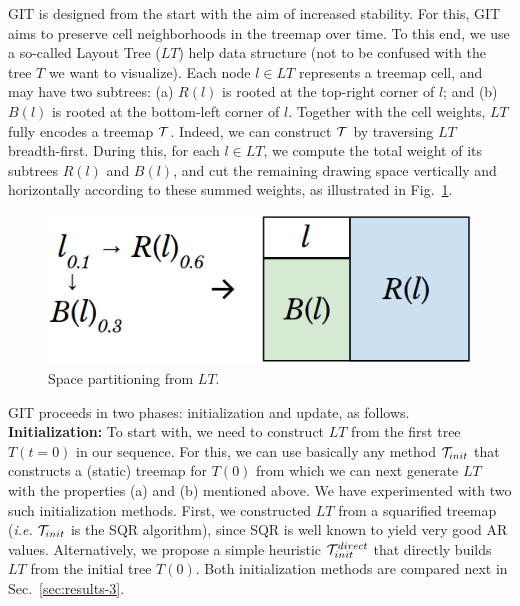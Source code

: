GIT is designed from the start with the aim of increased stability. For this, GIT aims to preserve cell neighborhoods in the treemap over time. To this end, we use a so-called Layout Tree ($LT$) help data structure (not to be confused with the tree $T$ we want to visualize).
Each node $l \in LT$ represents a treemap cell, and may have two subtrees: (a) $R(l)$ is rooted at the top-right corner of $l$; and (b) $B(l)$ is rooted at the bottom-left corner of $l$. Together with the cell weights, $LT$ fully encodes a treemap ${\cal T}$. Indeed, we can construct ${\cal T}$ by traversing $LT$ breadth-first.
During this, for each $l \in LT$, we compute the total weight of its subtrees $R(l)$ and $B(l)$, and cut the remaining drawing space vertically and horizontally according to these summed weights, as illustrated in Fig.~\ref{fig:space-partition}.

\begin{figure}
\centering
\includegraphics[width=.8\textwidth]{figures/treemap-algorithm/space-partition.png}
\caption{Space partitioning from $LT$.}
\label{fig:space-partition}
\end{figure}

GIT proceeds in two phases: initialization and update, as follows.\\

\noindent\textbf{Initialization:} To start with, we need to construct $LT$ from the first tree $T(t=0)$ in our sequence. For this, we can use basically any method ${\cal T}_{init}$ that constructs a (static) treemap for $T(0)$ from which we can next generate $LT$ with the properties (a) and (b) mentioned above. We have experimented with two such initialization methods. First, we constructed $LT$ from a squarified treemap (\emph{i.e.} ${\cal T}_{init}$ is the SQR algorithm), since SQR is well known to yield very good AR values. Alternatively, we propose a simple heuristic ${\cal T}_{init}^{direct}$ that directly builds $LT$ from the initial tree $T(0)$. Both initialization methods are compared next in Sec.~\ref{sec:results-3}.

